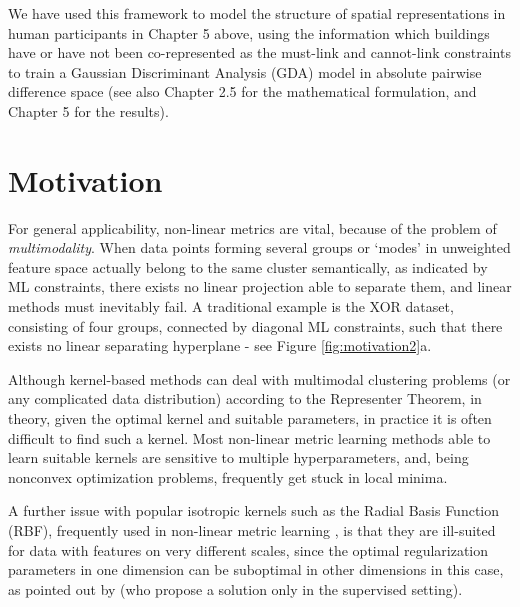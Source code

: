 We have used this framework to model the structure of spatial representations in human participants in Chapter 5 above, using the information which buildings have or have not been co-represented as the must-link and cannot-link constraints to train a Gaussian Discriminant Analysis (GDA) model in absolute pairwise difference space (see also Chapter 2.5 for the mathematical formulation, and Chapter 5 for the results). 

\section*{Motivation}

For general applicability, non-linear metrics are vital, because of the problem of \textit{multimodality}. When data points forming several groups or `modes' in unweighted feature space actually belong to the same cluster semantically, as indicated by ML constraints, there exists no linear projection able to separate them, and linear methods must inevitably fail. A traditional example is the XOR dataset, consisting of four groups, connected by diagonal ML constraints, such that there exists no linear separating hyperplane - see Figure \ref{fig:motivation2}a. 

Although kernel-based methods can deal with multimodal clustering problems (or any complicated data distribution) according to the Representer Theorem, in theory, given the optimal kernel and suitable parameters, in practice it is often difficult to find such a kernel. Most non-linear metric learning methods able to learn suitable kernels are sensitive to multiple hyperparameters, and, being nonconvex optimization problems, frequently get stuck in local minima.

A further issue with popular isotropic kernels such as the Radial Basis Function (RBF), frequently used in non-linear metric learning \citep{baghshah2010kernel, chitta2011approximate}, is that they are ill-suited for data with features on very different scales, since the optimal regularization parameters in one dimension can be suboptimal in other dimensions in this case, as pointed out by \citep{ong2005learning} (who propose a solution only in the supervised setting). 

